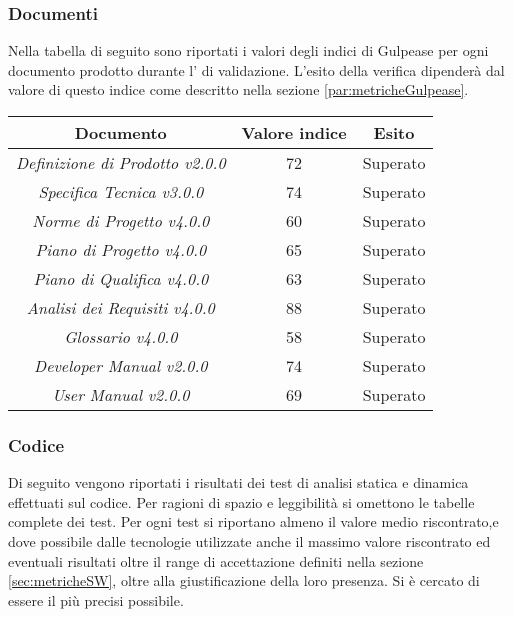 \documentclass{scalatekids-article}
\begin{document}
\subsubsection{Documenti}
Nella tabella di seguito sono riportati i valori degli indici di Gulpease per ogni documento prodotto durante l' di validazione. L'esito della verifica dipenderà dal valore di questo indice come descritto nella sezione \ref{par:metricheGulpease}.
\begin{center}
  \begin{tabular}{| c | c | c |}
    \hline
    Documento & Valore indice & Esito\\
    \hline
    \textit{Definizione di Prodotto v2.0.0} & 72 & Superato\\
    \textit{Specifica Tecnica v3.0.0} & 74 & Superato\\
    \textit{Norme di Progetto v4.0.0} & 60 & Superato\\
    \textit{Piano di Progetto v4.0.0} & 65 & Superato\\
    \textit{Piano di Qualifica v4.0.0} & 63 & Superato\\
    \textit{Analisi dei Requisiti v4.0.0} & 88 & Superato\\
    \textit{Glossario v4.0.0} & 58 & Superato\\
    \textit{Developer Manual v2.0.0} & 74 & Superato\\
    \textit{User Manual v2.0.0} & 69 & Superato\\
    \hline
  \end{tabular}
\end{center}

\subsubsection{Codice}
Di seguito vengono riportati i risultati dei test di analisi statica e dinamica effettuati sul codice.
Per ragioni di spazio e leggibilità si omettono le tabelle complete dei test. Per ogni test si riportano almeno il valore medio riscontrato,e dove possibile dalle tecnologie utilizzate anche il massimo valore riscontrato ed eventuali risultati oltre il range di accettazione definiti nella sezione \ref{sec:metricheSW}, oltre alla giustificazione della loro presenza. Si è cercato di essere il più precisi possibile.
\end{document}
